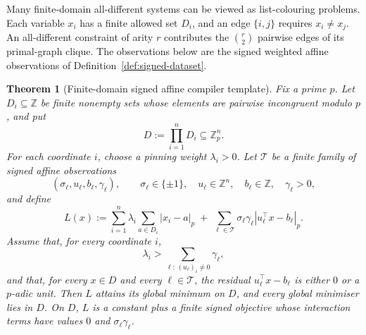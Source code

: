 \documentclass[11pt]{article}
\newtheorem{theorem}{Theorem}
\begin{document}
Many finite-domain all-different systems can be viewed as list-colouring problems. Each variable $x_i$ has a finite allowed set $D_i$, and an edge \(\{i,j\}\) requires \(x_i\neq x_j\). An all-different constraint of arity \(r\) contributes the \(\binom{r}{2}\) pairwise edges of its primal-graph clique. The observations below are the signed weighted affine observations of Definition~\ref{def:signed-dataset}.

\begin{theorem}[Finite-domain signed affine compiler template]
\label{thm:compiler-template}
Fix a prime \(p\). Let \(D_i\subseteq\mathbb Z\) be finite nonempty sets whose elements are pairwise incongruent modulo \(p\), and put
\[
D:=\prod_{i=1}^n D_i\subseteq\mathbb Z_p^n.
\]
For each coordinate \(i\), choose a pinning weight \(\lambda_i>0\). Let \(\mathcal T\) be a finite family of signed affine observations
\[
(\sigma_\ell,u_\ell,b_\ell,\gamma_\ell),
\qquad
\sigma_\ell\in\{\pm1\},\quad u_\ell\in\mathbb Z^n,\quad b_\ell\in\mathbb Z,\quad \gamma_\ell>0,
\]
and define
\[
L(x):=
\sum_{i=1}^n\lambda_i\sum_{a\in D_i}|x_i-a|_p
\;+\;
\sum_{\ell\in\mathcal T}\sigma_\ell\gamma_\ell |u_\ell^\top x-b_\ell|_p.
\]
Assume that, for every coordinate \(i\),
\[
\lambda_i>\sum_{\ell:\,(u_\ell)_i\neq 0}\gamma_\ell,
\]
and that, for every \(x\in D\) and every \(\ell\in\mathcal T\), the residual \(u_\ell^\top x-b_\ell\) is either \(0\) or a \(p\)-adic unit. Then \(L\) attains its global minimum on \(D\), and every global minimiser lies in \(D\). On \(D\), \(L\) is a constant plus a finite signed objective whose interaction terms have values \(0\) and \(\sigma_\ell\gamma_\ell\).
\end{theorem}
\end{document}

